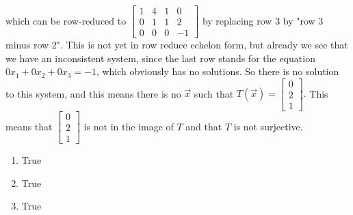 \begin{SaveQuestion}
			which can be row-reduced to   $\begin{bmatrix} 1  & 4 & 1 & 0 \\ 0 & 1 & 1 & 2 \\ 0 &  0& 0 & -1 \end{bmatrix}$ by replacing row 3 by "row 3 minus row 2".  This is not yet in row reduce echelon form, but already we see that we have an inconsistent system, since the last row stands for the equation $0x_1 + 0 x_2 + 0x_3 = -1$, which obviously has no solutions. So there is no solution to this system, and this means there is no $\vec x$ such that $T(\vec x) =  \begin{bmatrix} 0\\ 2 \\ 1  \end{bmatrix}.$ This means that  $\begin{bmatrix} 0\\ 2 \\ 1  \end{bmatrix}$ is not in the image of $T$ and that $T$ is not surjective.
\end{SaveQuestion}


\begin{SaveQuestion}[
        key=ch2-injsur-truefalse-sbg,
        prompt={State whether each of the following statements is True or False. For a linear transformation $T:\mathbb R^n \rightarrow \mathbb R^m$ given by $T(\vec x)=A\vec x$ we can say \begin{enumerate} \item  $T$ is surjective if and only if for all $\vec y$ in the codomain, the equation $A \vec x = \vec y$ has at least one solution. \item $T$ is injective if and only if for all $\vec y$ in the codomain, the equation $A\vec x = \vec y$ has at most one solution. \item $T$ is bijective  if and only if for all $\vec y$ in the codomain, the equation $A\vec x = \vec y$ has exactly  one solution. \end{enumerate}}
][ch2-CON-surinj,chg-CON-tf] %
    \begin{enumerate}
		\item True
        \item True
        \item True
	\end{enumerate}
\end{SaveQuestion}

